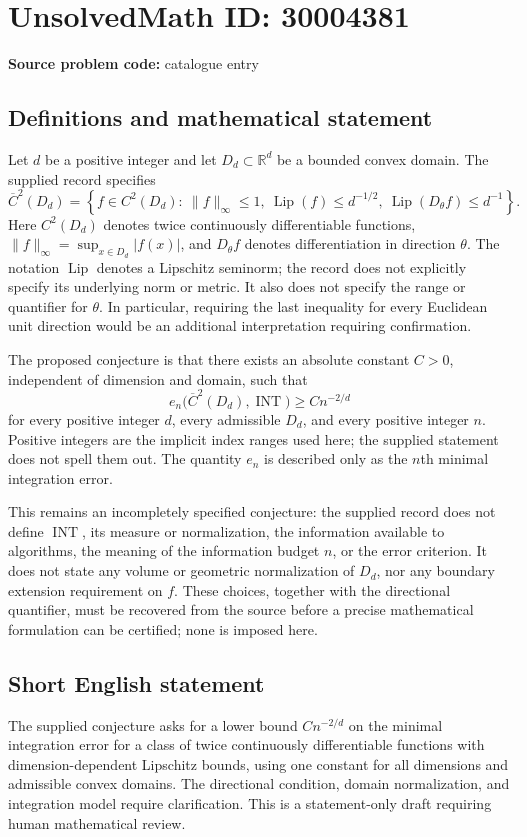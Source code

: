 \documentclass[11pt]{article}
\newcommand{\R}{\mathbb{R}}
\begin{document}
\section*{UnsolvedMath ID: 30004381}
\textbf{Source problem code:} catalogue entry
\subsection{Definitions and mathematical statement}
Let \(d\) be a positive integer and let \(D_d\subset\R^d\) be a bounded convex domain. The supplied record specifies
\[
\overline C^2(D_d)=\left\{f\in C^2(D_d):\ \|f\|_\infty\leq 1,\ \operatorname{Lip}(f)\leq d^{-1/2},\ \operatorname{Lip}(D_\theta f)\leq d^{-1}\right\}.
\]
Here \(C^2(D_d)\) denotes twice continuously differentiable functions, \(\|f\|_\infty=\sup_{x\in D_d}|f(x)|\), and \(D_\theta f\) denotes differentiation in direction \(\theta\). The notation \(\operatorname{Lip}\) denotes a Lipschitz seminorm; the record does not explicitly specify its underlying norm or metric. It also does not specify the range or quantifier for \(\theta\). In particular, requiring the last inequality for every Euclidean unit direction would be an additional interpretation requiring confirmation.

The proposed conjecture is that there exists an absolute constant \(C>0\), independent of dimension and domain, such that
\[
 e_n\bigl(\overline C^2(D_d),\operatorname{INT}\bigr)\geq C n^{-2/d}
\]
for every positive integer \(d\), every admissible \(D_d\), and every positive integer \(n\). Positive integers are the implicit index ranges used here; the supplied statement does not spell them out. The quantity \(e_n\) is described only as the \(n\)th minimal integration error.

This remains an incompletely specified conjecture: the supplied record does not define \(\operatorname{INT}\), its measure or normalization, the information available to algorithms, the meaning of the information budget \(n\), or the error criterion. It does not state any volume or geometric normalization of \(D_d\), nor any boundary extension requirement on \(f\). These choices, together with the directional quantifier, must be recovered from the source before a precise mathematical formulation can be certified; none is imposed here.
\subsection{Short English statement}
The supplied conjecture asks for a lower bound \(C n^{-2/d}\) on the minimal integration error for a class of twice continuously differentiable functions with dimension-dependent Lipschitz bounds, using one constant for all dimensions and admissible convex domains. The directional condition, domain normalization, and integration model require clarification. This is a statement-only draft requiring human mathematical review.
\end{document}
